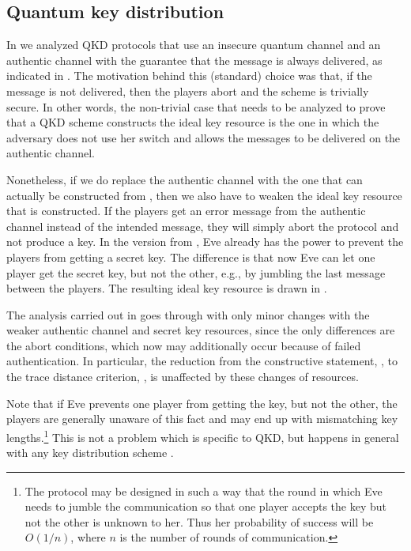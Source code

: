 
\subsection{Quantum key distribution}
\label{sec:smt.qkd}

In  we analyzed QKD protocols that use an insecure quantum channel and an authentic channel with the guarantee that the message is always delivered, as indicated in . The motivation behind this (standard) choice was that, if the message is not delivered, then the players abort and the scheme is trivially secure. In other words, the non-trivial case that needs to be analyzed to prove that a QKD scheme constructs  the ideal key resource is the one in which the adversary does not  use her switch and allows the messages to be delivered on the  authentic channel.

Nonetheless, if we do replace the authentic channel with the one that
can actually be constructed from , then we
also have to weaken the ideal key resource that is constructed. If the
players get an error message from the authentic channel instead of the
intended message, they will simply abort the protocol and not produce
a key. In the version from , Eve already has the power
to prevent the players from getting a secret key. The difference is
that now Eve can let one player get the secret key, but not the other,
e.g., by jumbling the last message between the players. The resulting
ideal key resource is drawn in .

The analysis carried out in  goes through with only
minor changes with the weaker authentic channel and secret key
resources, since the only differences are the abort conditions, which
now may additionally occur because of failed authentication. In
particular, the reduction from the constructive statement,
, to the trace distance criterion,
, is unaffected by these changes of resources.

Note that if Eve prevents one player from getting the key, but not the
other, the players are generally unaware of this fact and may end up
with mismatching key lengths.\footnote{The protocol may be designed in
  such a way that the round in which Eve needs to jumble the
  communication so that one player accepts the key but not the other
  is unknown to her. Thus her probability of success will be $O(1/n)$,
  where $n$ is the number of rounds of communication.}  This is not a
problem which is specific to QKD, but happens in general with any key
distribution scheme \cite{Wol99}.


